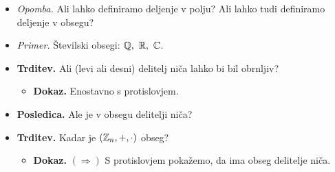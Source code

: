 \begin{enumerate}
\begin{itemize}
        \item \colorbox{yellow!30}{\emph{Opomba.}} Ali lahko definiramo deljenje v polju? Ali lahko tudi definiramo deljenje v obsegu?
        \item \colorbox{yellow!30}{\emph{Primer.}} Številski obsegi: $\QQ, \ \RR, \ \CC$.
        \item \colorbox{blue!30}{\textbf{Trditev.}} Ali (levi ali desni) delitelj niča lahko bi bil obrnljiv?
        \begin{itemize}
            \item \colorbox{green!30}{\textbf{Dokaz.}} Enostavno s protislovjem.
        \end{itemize}
        \item \colorbox{orange!30}{\textbf{Posledica.}} Ale je v obsegu delitelji niča?
        \item \colorbox{blue!30}{\textbf{Trditev.}} Kadar je $(\mathbb{Z}_n, +, \cdot)$ obseg?
        \begin{itemize}
            \item \colorbox{green!30}{\textbf{Dokaz.}} $(\Rightarrow)$ S protislovjem pokažemo, da ima obseg delitelje niča.
            

\end{itemize}
\end{itemize}
\end{enumerate}
